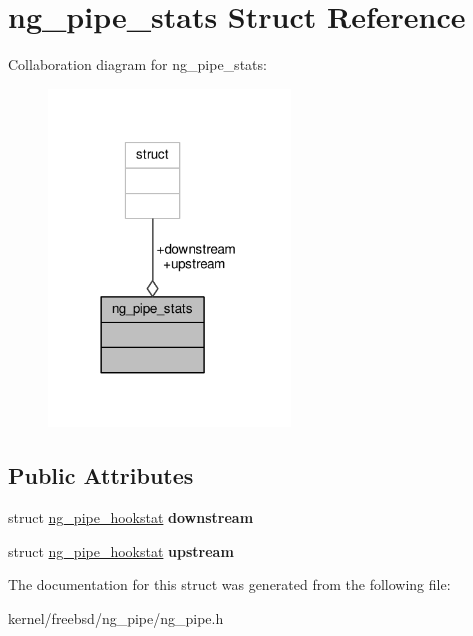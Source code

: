 \hypertarget{structng__pipe__stats}{\section{ng\+\_\+pipe\+\_\+stats Struct Reference}
\label{structng__pipe__stats}
}


Collaboration diagram for ng\+\_\+pipe\+\_\+stats\+:
\nopagebreak
\begin{figure}[H]
\begin{center}
\leavevmode
\includegraphics[width=182pt]{structng__pipe__stats__coll__graph}
\end{center}
\end{figure}
\subsection*{Public Attributes}
\begin{DoxyCompactItemize}
\item 
\hypertarget{structng__pipe__stats_a9aa472251b587ef62b02da1fc7f21c3a}{struct \hyperlink{structng__pipe__hookstat}{ng\+\_\+pipe\+\_\+hookstat} {\bfseries downstream}}\label{structng__pipe__stats_a9aa472251b587ef62b02da1fc7f21c3a}

\item 
\hypertarget{structng__pipe__stats_a3e267398629525d700d506eeb7797331}{struct \hyperlink{structng__pipe__hookstat}{ng\+\_\+pipe\+\_\+hookstat} {\bfseries upstream}}\label{structng__pipe__stats_a3e267398629525d700d506eeb7797331}

\end{DoxyCompactItemize}


The documentation for this struct was generated from the following file\+:\begin{DoxyCompactItemize}
\item 
kernel/freebsd/ng\+\_\+pipe/ng\+\_\+pipe.\+h\end{DoxyCompactItemize}
